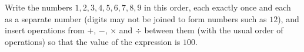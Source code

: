Write the numbers $1,2,3,4,5,6,7,8,9$ in this order, each exactly once and each as a separate number (digits may not be joined to form numbers such as $12$), and insert operations from $+$, $-$, $\times$ and $\div$ between them (with the usual order of operations) so that the value of the expression is $100$.
